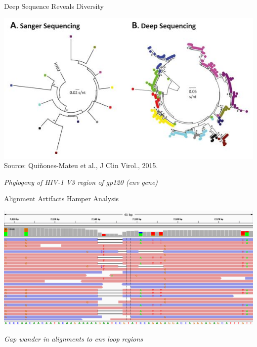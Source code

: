 \documentclass[notes=hide]{beamer}
\newcommand{\0}{\ensuremath{\mathtt{0}}}
\newcommand{\1}{\ensuremath{\mathtt{1}}}
\begin{document}
\begin{frame}{Deep Sequence Reveals Diversity}
\begin{center}
\includegraphics[width=\textwidth]{figs/hiv-env-v3-sanger-vs-ngs}\\
{\tiny Source: Qui\~{n}ones-Mateu et al., J Clin Virol., 2015.}
\end{center}
\begin{block}{}
\centering \emph{Phylogeny of HIV-1 V3 region of gp120 (env gene)} 
\end{block}
\end{frame}

\begin{frame}{Alignment Artifacts Hamper Analysis}
 \begin{center}
\includegraphics[width=\textwidth]{figs/5-virus-env-loop-igv-gap-wander}\\
\end{center}
\begin{block}{}
\centering \emph{Gap wander in alignments to env loop regions} 
\end{block}
\end{frame}
\end{document}
